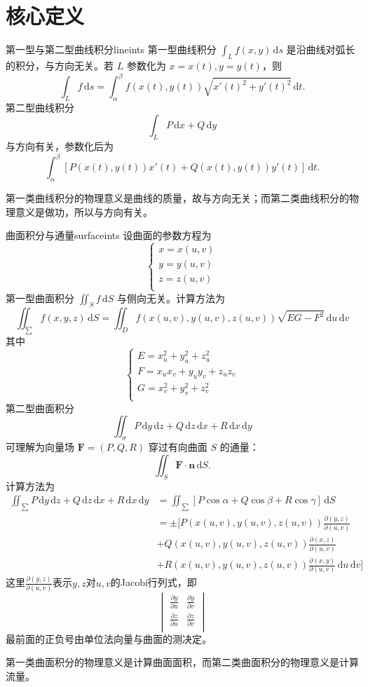 \documentclass[UTF8,zihao=-4,openany]{ctexbook}
\newcommand{\dd}{\,\mathrm{d}}
\begin{document}
\section{核心定义}
\begin{definition}{第一型与第二型曲线积分}{lineints}
第一型曲线积分 $\int_L f(x,y)\dd s$ 是沿曲线对弧长的积分，与方向无关。若 $L$ 参数化为 $x=x(t),y=y(t)$，则
\[
\int_L f\dd s=\int_\alpha^\beta f(x(t),y(t))\sqrt{x'(t)^2+y'(t)^2}\dd t.
\]
第二型曲线积分
\[
\int_L P\dd x+Q\dd y
\]
与方向有关，参数化后为
\[
\int_\alpha^\beta [P(x(t),y(t))x'(t)+Q(x(t),y(t))y'(t)]\dd t.
\]
\end{definition}
第一类曲线积分的物理意义是曲线的质量，故与方向无关；而第二类曲线积分的物理意义是做功，所以与方向有关。
\begin{definition}{曲面积分与通量}{surfaceints}
设曲面的参数方程为\[\begin{cases}
    x=x(u,v)\\
    y=y(u,v)\\
    z=z(u,v)\\
\end{cases}\]第一型曲面积分 $\iint_S f\dd S$ 与侧向无关。计算方法为\[
    \iint_{\sum} f(x,y,z)\dd S=\iint_{D}f(x(u,v),y(u,v),z(u,v))\sqrt{EG-F^2}\dd u\dd v
    \]其中\[
        \begin{cases}
            E=x_u^2+y_u^2+z_u^2\\
            F=x_ux_v+y_uy_v+z_uz_v\\
            G=x_v^2+y_v^2+z_v^2\\
        \end{cases}
    \]
第二型曲面积分
\[
\iint_{\sigma} P\dd y\dd z+Q\dd z\dd x+R\dd x\dd y
\]
可理解为向量场 $\bm F=(P,Q,R)$ 穿过有向曲面 $S$ 的通量：
\[
\iint_S \bm F\cdot \bm n\dd S.
\]计算方法为\[
 \begin{align*}
    \iint_{\sum} P\dd y\dd z+Q\dd z\dd x+R\dd x\dd y&=\iint_{\sum}[P\cos\alpha+Q\cos\beta+R\cos\gamma]\dd S\\
     &=\pm[P(x(u,v),y(u,v),z(u,v))\frac{\partial(y,z)}{\partial(u,v)}\\
     &+Q(x(u,v),y(u,v),z(u,v))\frac{\partial(x,z)}{\partial(u,v)}\\
     &+R(x(u,v),y(u,v),z(u,v))\frac{\partial(x,y)}{\partial(u,v)}\dd u \dd v]
 \end{align*}\]这里\(\frac{\partial(y,z)}{\partial(u,v)}\)表示\(y,z\)对\(u,v\)的Jacobi行列式，即\[
     \displaystyle\begin{vmatrix}
         \frac{\partial y}{\partial u}&\frac{\partial y}{\partial v}\\
         \frac{\partial z}{\partial u}&\frac{\partial z}{\partial v}\\
     \end{vmatrix}
 \]最前面的正负号由单位法向量与曲面的测决定。
\end{definition}
第一类曲面积分的物理意义是计算曲面面积，而第二类曲面积分的物理意义是计算流量。
\end{document}
